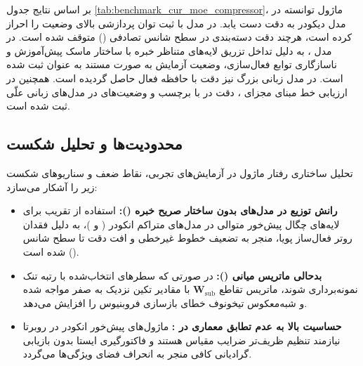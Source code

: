 بر اساس نتایج جدول \ref{tab:benchmark_cur_moe_compressor}، ماژول  توانسته در مدل دیکودر  به دقت  دست یابد. در مدل  با ثبت توان پردازشی بالای  وضعیت  را احراز کرده است، هرچند دقت دسته‌بندی  در سطح شانس تصادفی () متوقف شده است. در مدل ، به دلیل تداخل تزریق لایه‌های متناظر خبره با ساختار ماسک پیش‌آموزش و ناسازگاری توابع فعال‌سازی، وضعیت آزمایش به صورت مستند به عنوان  ثبت شده است. در مدل زبانی بزرگ  نیز دقت  با حافظه فعال  حاصل گردیده است. همچنین در ارزیابی خط مبنای مجزای ، دقت  در  با برچسب  و وضعیت‌های  در مدل‌های زبانی علّی ثبت شده است.

\subsection{محدودیت‌ها و تحلیل شکست}
تحلیل ساختاری رفتار ماژول  در آزمایش‌های تجربی، نقاط ضعف و سناریوهای شکست زیر را آشکار می‌سازد:
\begin{itemize}
    \item \textbf{رانش توزیع در مدل‌های بدون ساختار صریح خبره ():} استفاده از تقریب  برای لایه‌های چگال پیش‌خور متوالی در مدل‌های متراکم انکودر ( و )، به دلیل فقدان روتر فعال‌ساز پویا، منجر به تضعیف خطوط غیرخطی  و افت دقت تا سطح شانس () شده است.
    \item \textbf{بدحالی ماتریس میانی ():} در صورتی که سطرهای انتخاب‌شده با رتبه تنک نمونه‌برداری شوند، ماتریس تقاطع $\mathbf{W}_{\text{sub}}$ با مقادیر تکین نزدیک به صفر مواجه شده و شبه‌معکوس تیخونوف خطای بازسازی فروبنیوس را افزایش می‌دهد.
    \item \textbf{حساسیت بالا به عدم تطابق معماری در :} ماژول‌های پیش‌خور انکودر در روبرتا نیازمند تنظیم ظریف‌تر ضرایب مقیاس هستند و فاکتورگیری ایستا بدون بازیابی گرادیانی کافی منجر به انحراف فضای ویژگی‌ها می‌گردد.
\end{itemize}
